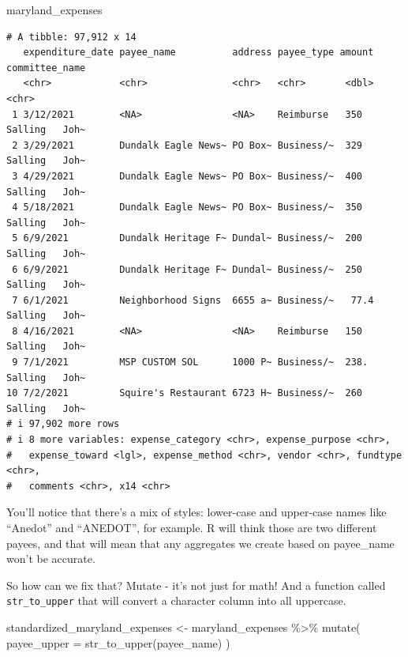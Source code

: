 \documentclass[
  letterpaper,
  DIV=11,
  numbers=noendperiod]{scrreprt}
\newenvironment{Shaded}{\begin{snugshade}}{\end{snugshade}}
\newcommand{\AttributeTok}[1]{\textcolor[rgb]{0.40,0.45,0.13}{#1}}
\newcommand{\FunctionTok}[1]{\textcolor[rgb]{0.28,0.35,0.67}{#1}}
\newcommand{\NormalTok}[1]{\textcolor[rgb]{0.00,0.23,0.31}{#1}}
\newcommand{\OtherTok}[1]{\textcolor[rgb]{0.00,0.23,0.31}{#1}}
\newcommand{\SpecialCharTok}[1]{\textcolor[rgb]{0.37,0.37,0.37}{#1}}
\begin{document}
\begin{Shaded}
\begin{Highlighting}[]
\NormalTok{maryland\_expenses}
\end{Highlighting}
\end{Shaded}

\begin{verbatim}
# A tibble: 97,912 x 14
   expenditure_date payee_name          address payee_type amount committee_name
   <chr>            <chr>               <chr>   <chr>       <dbl> <chr>         
 1 3/12/2021        <NA>                <NA>    Reimburse   350   Salling   Joh~
 2 3/29/2021        Dundalk Eagle News~ PO Box~ Business/~  329   Salling   Joh~
 3 4/29/2021        Dundalk Eagle News~ PO Box~ Business/~  400   Salling   Joh~
 4 5/18/2021        Dundalk Eagle News~ PO Box~ Business/~  350   Salling   Joh~
 5 6/9/2021         Dundalk Heritage F~ Dundal~ Business/~  200   Salling   Joh~
 6 6/9/2021         Dundalk Heritage F~ Dundal~ Business/~  250   Salling   Joh~
 7 6/1/2021         Neighborhood Signs  6655 a~ Business/~   77.4 Salling   Joh~
 8 4/16/2021        <NA>                <NA>    Reimburse   150   Salling   Joh~
 9 7/1/2021         MSP CUSTOM SOL      1000 P~ Business/~  238.  Salling   Joh~
10 7/2/2021         Squire's Restaurant 6723 H~ Business/~  260   Salling   Joh~
# i 97,902 more rows
# i 8 more variables: expense_category <chr>, expense_purpose <chr>,
#   expense_toward <lgl>, expense_method <chr>, vendor <chr>, fundtype <chr>,
#   comments <chr>, x14 <chr>
\end{verbatim}

You'll notice that there's a mix of styles: lower-case and upper-case
names like ``Anedot'' and ``ANEDOT'', for example. R will think those
are two different payees, and that will mean that any aggregates we
create based on payee\_name won't be accurate.

So how can we fix that? Mutate - it's not just for math! And a function
called \texttt{str\_to\_upper} that will convert a character column into
all uppercase.

\begin{Shaded}
\begin{Highlighting}[]
\NormalTok{standardized\_maryland\_expenses }\OtherTok{\textless{}{-}}\NormalTok{ maryland\_expenses }\SpecialCharTok{\%\textgreater{}\%}
  \FunctionTok{mutate}\NormalTok{(}
    \AttributeTok{payee\_upper =} \FunctionTok{str\_to\_upper}\NormalTok{(payee\_name)}
\NormalTok{)}
\end{Highlighting}
\end{Shaded}
\end{document}
